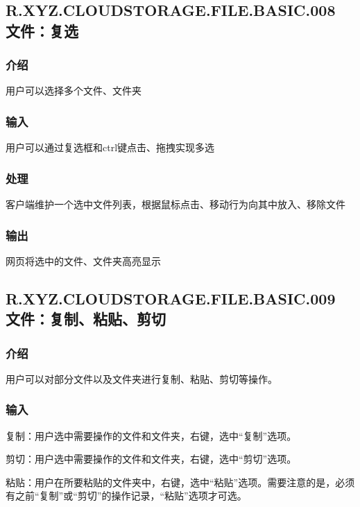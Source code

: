 \subsection{R.XYZ.CLOUDSTORAGE.FILE.BASIC.008 文件：复选}

\subsubsection{介绍}

用户可以选择多个文件、文件夹

\subsubsection{输入}

用户可以通过复选框和ctrl键点击、拖拽实现多选

\subsubsection{处理}

客户端维护一个选中文件列表，根据鼠标点击、移动行为向其中放入、移除文件

\subsubsection{输出}

网页将选中的文件、文件夹高亮显示



\subsection{R.XYZ.CLOUDSTORAGE.FILE.BASIC.009 文件：复制、粘贴、剪切}

\subsubsection{介绍} 
用户可以对部分文件以及文件夹进行复制、粘贴、剪切等操作。

\subsubsection{输入} 
复制：用户选中需要操作的文件和文件夹，右键，选中“复制”选项。

剪切：用户选中需要操作的文件和文件夹，右键，选中“剪切”选项。

粘贴：用户在所要粘贴的文件夹中，右键，选中“粘贴”选项。需要注意的是，必须有之前“复制”或“剪切”的操作记录，“粘贴”选项才可选。

